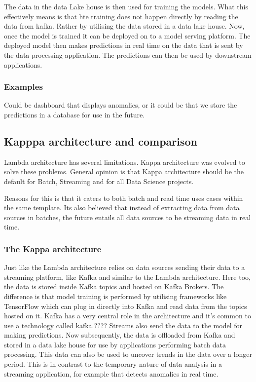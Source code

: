 \documentclass[a4paper, 11pt]{book}
\begin{document}
    The data in the data Lake house is then used for training the models.
    What this effectively means is that hte training does not happen directly by reading the data from kafka.
    Rather by utilising the data stored in a data lake house.
    Now, once the model is trained it can be deployed on to a model serving platform.
    The deployed model then makes predictions in real time on the data that is sent by the data processing application.
    The predictions can then be used by downstream applications.

    \subsubsection{Examples}
    Could be dashboard that displays anomalies, or it could be that we store the predictions in a database for use in the future.

    \subsection{Kapppa architecture and comparison}
    Lambda architecture has several limitations.
    Kappa architecture was evolved to solve these problems.
    General opinion is that Kappa architecture should be the default for Batch, Streaming and for all Data Science projects.

    Reasons for this is that it caters to both batch and read time uses cases within the same template.
    Its also believed that instead of extracting data from data sources in batches, the future entails all data sources to be streaming data in real time.

    \subsubsection{The Kappa architecture}
    Just like the Lambda architecture relies on data sources sending their data to a streaming platform, like Kafka and similar to the Lambda architecture.
    Here too, the data is stored inside Kafka topics and hosted on Kafka Brokers.
    The difference is that model training is performed by utilising frameworks like TensorFlow which can plug in directly into Kafka and read data from the topics hosted on it.
    Kafka has a very central role in the architecture and it's common to use a technology called kafka.????
    Streams also send the data to the model for making predictions.
    Now subsequently, the data is offloaded from Kafka and stored in a data lake house for use by applications performing batch data processing.
    This data can also be used to uncover trends in the data over a longer period.
    This is in contrast to the temporary nature of data analysis in a streaming application, for example that detects anomalies in real time.
\end{document}
